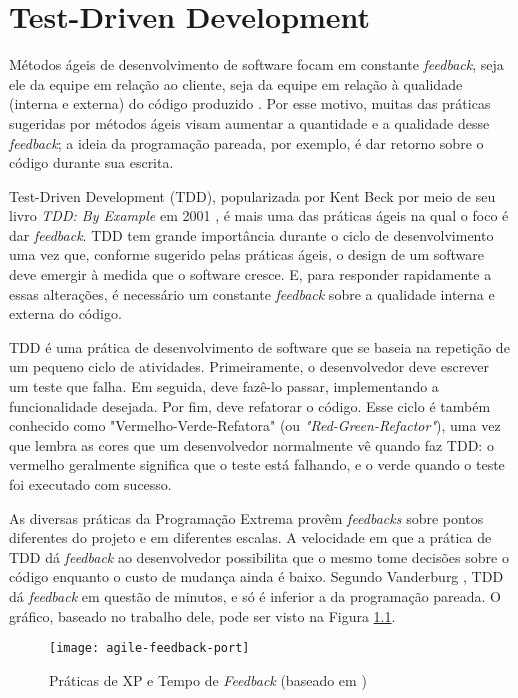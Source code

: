 \chapter{Test-Driven Development}
\label{cap:tdd}

Métodos ágeis de desenvolvimento de software focam em constante
\textit{feedback}, seja ele da equipe em relação ao cliente, seja da equipe em relação à
qualidade (interna e externa) do código produzido \cite{AgileManifesto}. Por
esse motivo, muitas das práticas sugeridas por métodos ágeis visam aumentar a 
quantidade e a qualidade desse \textit{feedback}; a ideia da programação pareada, por
exemplo, é dar retorno sobre o código durante sua escrita.

Test-Driven Development (TDD), popularizada por Kent Beck por meio de seu livro
\textit{TDD: By Example} em 2001 \cite{TDDByExample}, é mais uma das práticas
ágeis na qual o foco é dar \textit{feedback}. TDD tem grande importância durante o ciclo
de desenvolvimento uma vez que, conforme sugerido pelas práticas ágeis, o design de um
software deve emergir à medida que o software cresce. E, para responder
rapidamente a essas alterações, é necessário um constante \textit{feedback} sobre a
qualidade interna e externa do código.

TDD é uma prática de desenvolvimento de software que se baseia na repetição de
um pequeno ciclo de atividades. Primeiramente, o desenvolvedor deve escrever um
teste que falha. Em seguida, deve fazê-lo passar, implementando a
funcionalidade desejada. Por fim, deve refatorar o código. Esse ciclo
é também conhecido como 
"Vermelho-Verde-Refatora" (ou \textit{"Red-Green-Refactor"}), uma vez que lembra as cores que um 
desenvolvedor normalmente vê quando faz TDD: o vermelho geralmente significa que
o teste está falhando, e o verde quando o teste foi executado com sucesso.

As diversas práticas da Programação Extrema provêm \textit{feedbacks} sobre pontos diferentes 
do projeto e em diferentes escalas. 
A velocidade em que a prática de TDD dá \textit{feedback} ao desenvolvedor possibilita que o mesmo
tome decisões sobre o código enquanto o custo de mudança ainda é
baixo. Segundo Vanderburg \cite{vanderburg}, TDD dá \textit{feedback} em questão de
minutos, e só é inferior a da programação pareada. O gráfico,
baseado no trabalho dele, pode ser visto na Figura
\ref{fig:agile-feedback}.

\begin{figure}
  \centering
  \texttt{[image: agile-feedback-port]}
  \caption{Práticas de XP e Tempo de \textit{Feedback} (baseado em \cite{vanderburg})}
  \label{fig:agile-feedback}
\end{figure}

